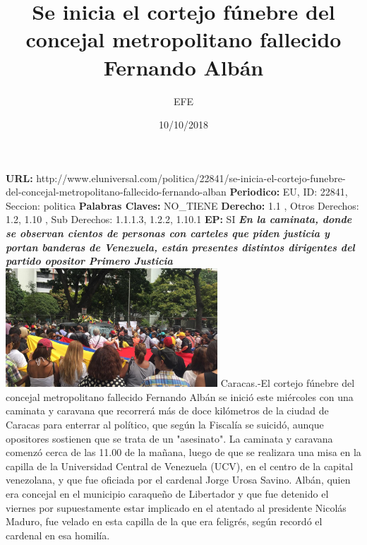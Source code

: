 \documentclass{article}%
\title{\textbf{Se inicia el cortejo fúnebre del concejal metropolitano fallecido Fernando Albán}}%
\author{EFE}%
\date{10/10/2018}%
\begin{document}
%
\normalsize%
\maketitle%
\textbf{URL: }%
http://www.eluniversal.com/politica/22841/se{-}inicia{-}el{-}cortejo{-}funebre{-}del{-}concejal{-}metropolitano{-}fallecido{-}fernando{-}alban\newline%
%
\textbf{Periodico: }%
EU, %
ID: %
22841, %
Seccion: %
politica\newline%
%
\textbf{Palabras Claves: }%
NO\_TIENE\newline%
%
\textbf{Derecho: }%
1.1%
, Otros Derechos: %
1.2, 1.10%
, Sub Derechos: %
1.1.1.3, 1.2.2, 1.10.1%
\newline%
%
\textbf{EP: }%
SI\newline%
\newline%
%
\textbf{\textit{En la caminata, donde se observan cientos de personas con carteles que piden justicia y portan banderas de Venezuela, están presentes distintos dirigentes del partido opositor Primero Justicia}}%
\newline%
\newline%
%
\includegraphics[width=300px]{253.jpg}%
\newline%
%
Caracas.{-}El cortejo fúnebre del concejal metropolitano fallecido Fernando Albán se inició este miércoles con una caminata y caravana que recorrerá más de doce kilómetros de la ciudad de Caracas para enterrar al político, que según la Fiscalía se suicidó, aunque opositores sostienen que se trata de un "asesinato".%
\newline%
%
La caminata y caravana comenzó cerca de las 11.00 de la mañana, luego de que se realizara una misa en la capilla de la Universidad Central de Venezuela (UCV), en el centro de la capital venezolana, y que fue oficiada por el cardenal Jorge Urosa Savino.%
\newline%
%
Albán, quien era concejal en el municipio caraqueño de Libertador y que fue detenido el viernes por supuestamente estar implicado en el atentado al presidente Nicolás Maduro, fue velado en esta capilla de la que era feligrés, según recordó el cardenal en esa homilía.%
\end{document}
